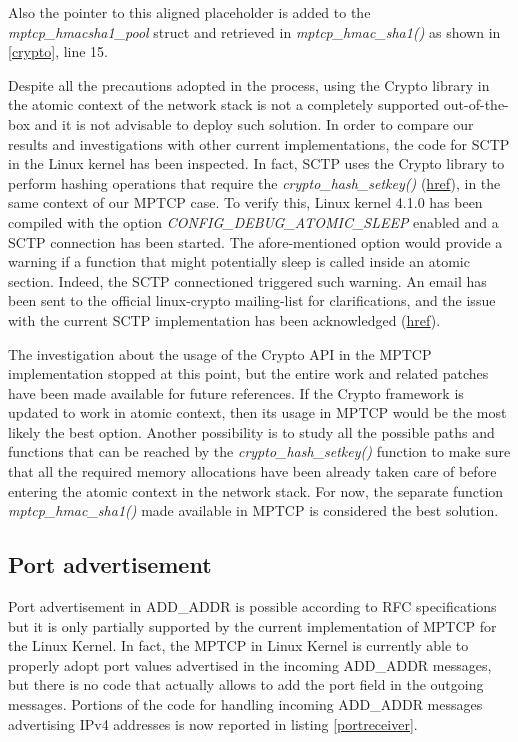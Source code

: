 Also the pointer to this aligned placeholder is added to the \textit{mptcp\_hmacsha1\_pool} struct and retrieved in \textit{mptcp\_hmac\_sha1()} as shown in \ref{crypto}, line 15. 


Despite all the precautions adopted in the process, using the Crypto library in the atomic context of the network stack is not a completely supported out-of-the-box and it is not advisable to deploy such solution. In order to compare our results and investigations with other current implementations, the code for SCTP in the Linux kernel has been inspected. In fact, SCTP uses the Crypto library to perform hashing operations that require the \textit{crypto\_hash\_setkey()} (\href{http://lxr.free-electrons.com/source/net/sctp/auth.c#L751}{href}), in the same context of our MPTCP case. To verify this, Linux kernel 4.1.0 has been compiled with the option \textit{CONFIG\_DEBUG\_ATOMIC\_SLEEP} enabled and a SCTP connection has been started. The afore-mentioned option would provide a warning if a function that might potentially sleep is called inside an atomic section. Indeed, the SCTP connectioned triggered such warning.
An email has been sent to the official linux-crypto mailing-list for clarifications, and the issue with the current SCTP implementation has been acknowledged (\href{http://comments.gmane.org/gmane.linux.kernel.cryptoapi/17937}{href}).


The investigation about the usage of the Crypto API in the MPTCP implementation stopped at this point, but the entire work and related patches have been made available for future references. If the Crypto framework is updated to work in atomic context, then its usage in MPTCP would be the most likely the best option. Another possibility is to study all the possible paths and functions that can be reached by the \textit{crypto\_hash\_setkey()} function to make sure that all the required memory allocations have been already taken care of before entering the atomic context in the network stack. For now, the separate function \textit{mptcp\_hmac\_sha1()} made available in MPTCP is considered the best solution.


\subsection{Port advertisement}
\label{portad}
Port advertisement in ADD\_ADDR is possible according to RFC specifications but it is only partially supported by the current implementation of MPTCP for the Linux Kernel. In fact, the MPTCP in Linux Kernel is currently able to properly adopt port values advertised in the incoming ADD\_ADDR messages, but there is no code that actually allows to add the port field in the outgoing messages.
Portions of the code for handling incoming ADD\_ADDR messages advertising IPv4 addresses is now reported in listing \ref{portreceiver}.

